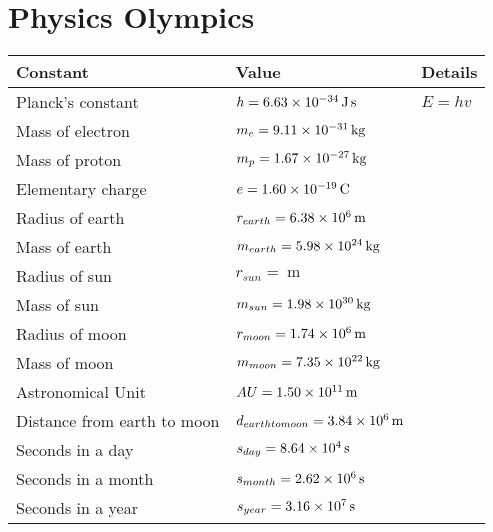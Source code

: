 \documentclass{article}
\begin{document}
\section{Physics Olympics}
\begin{table}[H]
	\centering
	\begin{tabularx}{0.75\textwidth}{ X X X }
		Constant & Value & Details \\
		\hline
		Planck's constant & $h = \SI[per-mode=symbol]{6.63E-34}{\J\s}$ & $E = hv$ \\
		Mass of electron & $m_e = \SI[per-mode=symbol]{9.11E-31}{\kg}$ & \\
		Mass of proton & $m_p = \SI[per-mode=symbol]{1.67E-27}{\kg}$ & \\
		Elementary charge & $e = \SI[per-mode=symbol]{1.60E-19}{\coulomb}$ & \\
		Radius of earth & $r_{earth} = \SI[per-mode=symbol]{6.38E6}{\m}$ & \\
		Mass of earth & $m_{earth} = \SI[per-mode=symbol]{5.98E24}{\kg}$ & \\
		Radius of sun & $r_{sun} = \SI[per-mode=symbol]{}{\m}$ & \\
		Mass of sun & $m_{sun} = \SI[per-mode=symbol]{1.98E30}{\kg}$ & \\
		Radius of moon & $r_{moon} = \SI[per-mode=symbol]{1.74E6}{\m}$ & \\
		Mass of moon & $m_{moon} = \SI[per-mode=symbol]{7.35E22}{\kg}$ & \\
		Astronomical Unit & $AU = \SI[per-mode=symbol]{1.50E11}{\m}$ & \\
		Distance from earth to moon & $d_{earth to moon} = \SI[per-mode=symbol]{3.84E6}{\m}$ & \\
		Seconds in a day & $s_{day} = \SI[per-mode=symbol]{8.64E4}{\s}$ & \\
		Seconds in a month & $s_{month} = \SI[per-mode=symbol]{2.62E6}{\s}$ & \\
		Seconds in a year & $s_{year} = \SI[per-mode=symbol]{3.16E7}{\s}$ & \\
	\end{tabularx}
\end{table}
\end{document}
